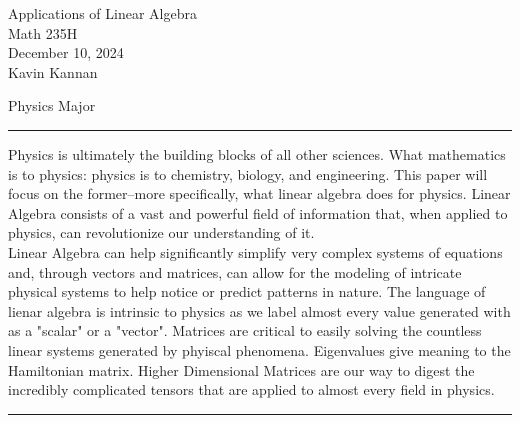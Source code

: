 \documentclass[12pt,letterpaper, onecolumn]{exam}
\begin{document}
\begingroup  
    \centering
    \LARGE Applications of Linear Algebra\\
    \LARGE Math 235H\\[0.5em]
    \large December 10, 2024\\[0.5em]
    \large Kavin Kannan\par
    \large Physics Major\par
\endgroup
\rule{\textwidth}{0.4pt}

\begingroup %
Physics is ultimately the building blocks of all other sciences. What mathematics is to 
physics: physics is to chemistry, biology, and engineering. This paper will focus on the 
former--more specifically, what linear algebra does for physics. Linear Algebra consists of a 
vast and powerful field of information that, when applied to physics, can revolutionize our 
understanding of it.\\
\indent Linear Algebra can help significantly simplify very complex systems of equations and, through 
vectors and matrices, can allow for the modeling of intricate physical systems to help notice 
or predict patterns in nature. The language of lienar algebra is intrinsic to physics as we 
label almost every value generated with as a "scalar" or a "vector". Matrices are critical to easily 
solving the countless linear systems generated by phyiscal phenomena. Eigenvalues 
give meaning to the Hamiltonian matrix. Higher Dimensional Matrices are our way to digest 
the incredibly complicated tensors that are applied to almost every field in physics. 
\endgroup
\rule{\textwidth}{0.4pt}
\end{document}

